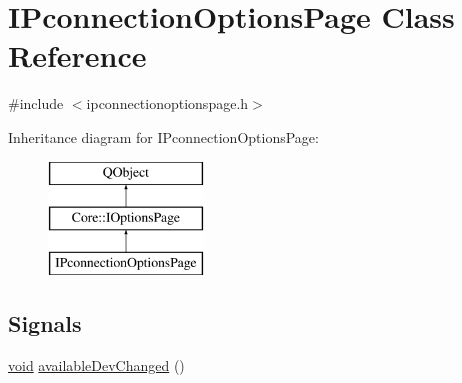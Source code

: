 \hypertarget{class_i_pconnection_options_page}{\section{I\-Pconnection\-Options\-Page Class Reference}
\label{class_i_pconnection_options_page}
}


{\ttfamily \#include $<$ipconnectionoptionspage.\-h$>$}

Inheritance diagram for I\-Pconnection\-Options\-Page\-:\begin{figure}[H]
\begin{center}
\leavevmode
\includegraphics[height=3.000000cm]{class_i_pconnection_options_page}
\end{center}
\end{figure}
\subsection*{Signals}
\begin{DoxyCompactItemize}
\item 
\hyperlink{group___u_a_v_objects_plugin_ga444cf2ff3f0ecbe028adce838d373f5c}{void} \hyperlink{group___i_p_conn_plugin_ga1fa25251ff83374c3d8c41d161406b3a}{available\-Dev\-Changed} ()
\end{DoxyCompactItemize}
